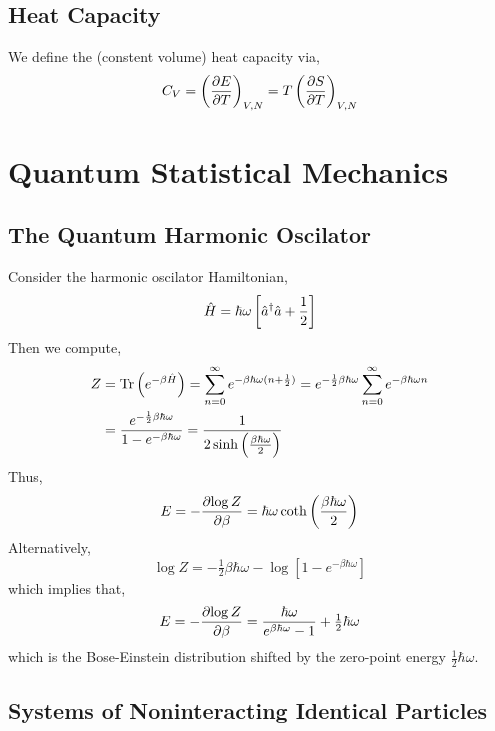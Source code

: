 \documentclass[12pt]{article}
\begin{document}
\subsection{Heat Capacity}

We define the (constent volume) heat capacity via,
\[ C_V = \left( \frac{\partial{E}}{\partial{T}} \right)_{V,N} = T \left( \frac{\partial{S}}{\partial{T}} \right)_{V, N} \]

\section{Quantum Statistical Mechanics}

\subsection{The Quantum Harmonic Oscilator}

Consider the harmonic oscilator Hamiltonian,
\[ \hat{H} = \hbar \omega \left[ \hat{a}^\dagger \hat{a} + \frac{1}{2} \right] \]
Then we compute,
\begin{align*}
Z & = \mathrm{Tr} \left( e^{-\beta \hat{H}} \right) = \sum_{n = 0}^\infty e^{-\beta \hbar \omega (n + \frac{1}{2})} = e^{-\frac{1}{2} \beta \hbar \omega} \sum_{n = 0}^\infty e^{- \beta \hbar \omega n}
\\
& = \frac{e^{-\frac{1}{2} \beta \hbar \omega}}{1 - e^{-\beta \hbar \omega}} = \frac{1}{2 \sinh{\left( \frac{\beta \hbar \omega}{2} \right)}}
\end{align*}
Thus,
\[ E = - \frac{\partial{\log{Z}}}{\partial{\beta}} = \hbar \omega \coth{\left( \frac{\beta \hbar \omega}{2} \right)} \]
Alternatively,
\[ 
\log{Z} = - \tfrac{1}{2} \beta \hbar \omega - \log{[1 - e^{-\beta \hbar \omega}]} \]
which implies that,
\[ E = - \frac{\partial{\log{Z}}}{\partial{\beta}} = \frac{\hbar \omega}{e^{\beta \hbar \omega} - 1} + \tfrac{1}{2} \hbar \omega \]
which is the Bose-Einstein distribution shifted by the zero-point energy $\frac{1}{2} \hbar \omega$.

\subsection{Systems of Noninteracting Identical Particles}
\end{document}
